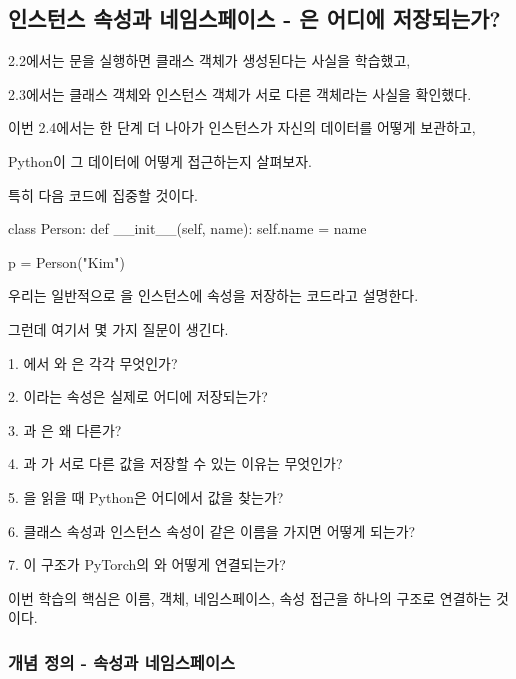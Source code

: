 

\subsection{인스턴스 속성과 네임스페이스 - 은 어디에 저장되는가?}

2.2에서는 문을 실행하면 클래스 객체가 생성된다는 사실을 학습했고,

2.3에서는 클래스 객체와 인스턴스 객체가 서로 다른 객체라는 사실을 확인했다.

이번 2.4에서는 한 단계 더 나아가 인스턴스가 자신의 데이터를 어떻게 보관하고,

Python이 그 데이터에 어떻게 접근하는지 살펴보자.

특히 다음 코드에 집중할 것이다.

\begin{dhkcode}
class Person:
    def __init__(self, name):
        self.name = name

p = Person("Kim")
\end{dhkcode}

우리는 일반적으로 을 인스턴스에 속성을 저장하는 코드라고 설명한다.

그런데 여기서 몇 가지 질문이 생긴다.

\begin{dhksmry}
1. 에서 와 은 각각 무엇인가?

2. 이라는 속성은 실제로 어디에 저장되는가?

3. 과 은 왜 다른가?

4. 과 가 서로 다른 값을 저장할 수 있는 이유는 무엇인가?

5. 을 읽을 때 Python은 어디에서 값을 찾는가?

6. 클래스 속성과 인스턴스 속성이 같은 이름을 가지면 어떻게 되는가?

7. 이 구조가 PyTorch의 와 어떻게 연결되는가?
\end{dhksmry}

이번 학습의 핵심은 이름, 객체, 네임스페이스, 속성 접근을 하나의 구조로 연결하는 것이다.

\subsubsection{개념 정의 - 속성과 네임스페이스}

